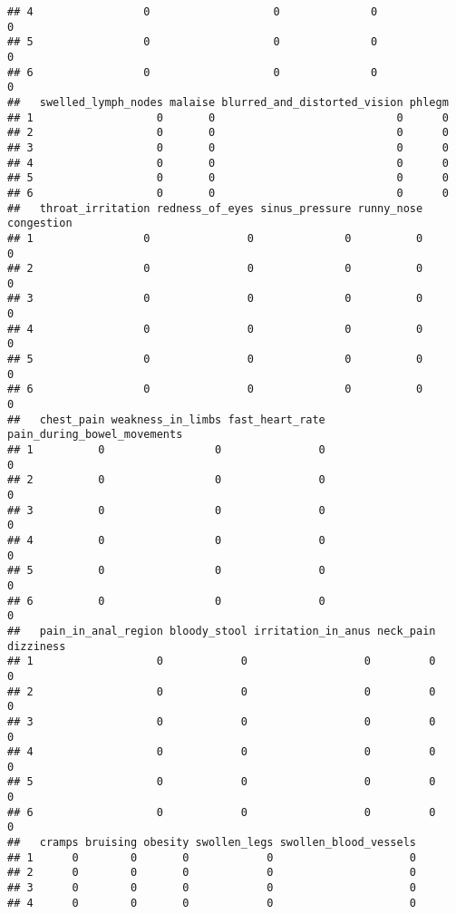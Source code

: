 \documentclass[
]{article}
\begin{document}
\begin{verbatim}
## 4                 0                   0              0                   0
## 5                 0                   0              0                   0
## 6                 0                   0              0                   0
##   swelled_lymph_nodes malaise blurred_and_distorted_vision phlegm
## 1                   0       0                            0      0
## 2                   0       0                            0      0
## 3                   0       0                            0      0
## 4                   0       0                            0      0
## 5                   0       0                            0      0
## 6                   0       0                            0      0
##   throat_irritation redness_of_eyes sinus_pressure runny_nose congestion
## 1                 0               0              0          0          0
## 2                 0               0              0          0          0
## 3                 0               0              0          0          0
## 4                 0               0              0          0          0
## 5                 0               0              0          0          0
## 6                 0               0              0          0          0
##   chest_pain weakness_in_limbs fast_heart_rate pain_during_bowel_movements
## 1          0                 0               0                           0
## 2          0                 0               0                           0
## 3          0                 0               0                           0
## 4          0                 0               0                           0
## 5          0                 0               0                           0
## 6          0                 0               0                           0
##   pain_in_anal_region bloody_stool irritation_in_anus neck_pain dizziness
## 1                   0            0                  0         0         0
## 2                   0            0                  0         0         0
## 3                   0            0                  0         0         0
## 4                   0            0                  0         0         0
## 5                   0            0                  0         0         0
## 6                   0            0                  0         0         0
##   cramps bruising obesity swollen_legs swollen_blood_vessels
## 1      0        0       0            0                     0
## 2      0        0       0            0                     0
## 3      0        0       0            0                     0
## 4      0        0       0            0                     0

\end{verbatim}
\end{document}
